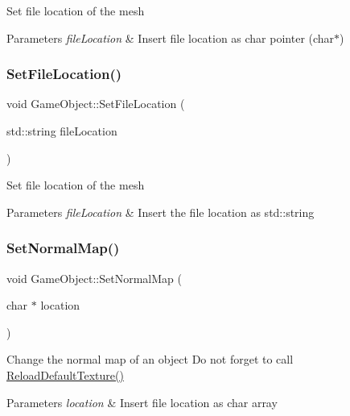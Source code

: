 Set file location of the mesh 
\begin{DoxyParams}{Parameters}
{\em file\+Location} & Insert file location as char pointer (char$\ast$) \\
\hline
\end{DoxyParams}
\mbox{\label{class_game_object_a4df7e5070a936fdcfc340f230d3a92ca}} 
\subsubsection{\texorpdfstring{SetFileLocation()}{SetFileLocation()}\hspace{0.1cm}{\footnotesize\ttfamily [2/2]}}
{\footnotesize\ttfamily void Game\+Object\+::\+Set\+File\+Location (\begin{DoxyParamCaption}\item[{std\+::string}]{file\+Location }\end{DoxyParamCaption})}

Set file location of the mesh 
\begin{DoxyParams}{Parameters}
{\em file\+Location} & Insert the file location as std\+::string \\
\hline
\end{DoxyParams}
\mbox{\label{class_game_object_aaf56a5e3eb48be96bb1ee4796429d28e}} 
\subsubsection{\texorpdfstring{SetNormalMap()}{SetNormalMap()}\hspace{0.1cm}{\footnotesize\ttfamily [1/2]}}
{\footnotesize\ttfamily void Game\+Object\+::\+Set\+Normal\+Map (\begin{DoxyParamCaption}\item[{char $\ast$}]{location }\end{DoxyParamCaption})}

Change the normal map of an object Do not forget to call \mbox{\hyperlink{class_game_object_a007ca9940b38a71eae51efefda676e4f}{Reload\+Default\+Texture()}} 
\begin{DoxyParams}{Parameters}
{\em location} & Insert file location as char array \\
\hline
\end{DoxyParams}
\mbox{\label{class_game_object_a96b709620f150364772eeba91870f34f}} 
